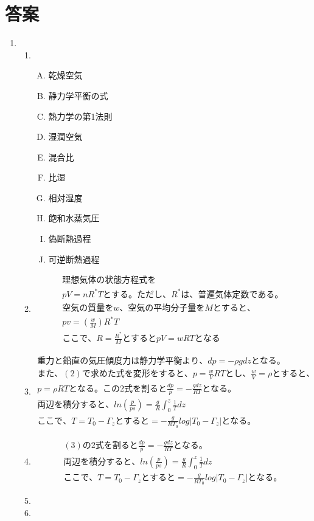 \documentclass{jsarticle}
\newenvironment{problems}
{
  \renewcommand\labelenumi{\doublebox{\arabic{enumi}}}
  \begin{enumerate}
}{
  \end{enumerate}
  \renewcommand\labelenumi{\arabic{enumi}.}
}
\begin{document}
\section{答案}
\begin{problems}
\item 
	\begin{enumerate}[(1)]
  \item
  	\begin{enumerate}[(A)]
      \item 乾燥空気
      \item 静力学平衡の式
      \item 熱力学の第1法則
      \item 湿潤空気
      \item 混合比
      \item 比湿
      \item 相対湿度
      \item 飽和水蒸気圧
      \item 偽断熱過程
      \item 可逆断熱過程
    \end{enumerate}
  \item 
  \begin{eqnarray*}
    理想気体の状態方程式を\\
    pV=nR^{\ast} T
    とする。ただし、R^{\ast}は、普遍気体定数である。\\
    空気の質量をw、空気の平均分子量をMとすると、\\
    pv=(\frac{w}{M})R^{\ast}T\\
    ここで、R = \frac{R^{\ast}}{M}とするとpV = wRTとなる
  \end{eqnarray*}
  \item
    \begin{align*}
    重力と鉛直の気圧傾度力は静力学平衡より、dp = -\rho gdzとなる。\\
    また、(2)で求めた式を変形をすると、p = \frac{w}{V}RTとし、\frac{w}{V}=\rho とすると、\\
    p = \rho RTとなる。
    この2式を割ると\frac{dp}{p} = -\frac{gdz}{RT}となる。\\
    両辺を積分すると、ln(\frac{p}{ps})=\frac{g}{R} \int_{0}^{z} \frac{1}{T}dz\\
    ここで、T = T_0 - \Gamma_z とすると
    = -\frac{g}{RT_0}log|T_0 - \Gamma_z|となる。
  \end{align*}
  \item
      \begin{align*}
      (3)の2式を割ると\frac{dp}{p} = -\frac{gdz}{RT}となる。\\
    両辺を積分すると、ln(\frac{p}{ps})=\frac{g}{R} \int_{0}^{z} \frac{1}{T}dz\\
    ここで、T = T_0 - \Gamma_z とすると
    = -\frac{g}{RT_0}log|T_0 - \Gamma_z|となる。
  \end{align*}
  \item
  \item
  

\end{enumerate}
\end{problems}
\end{document}
